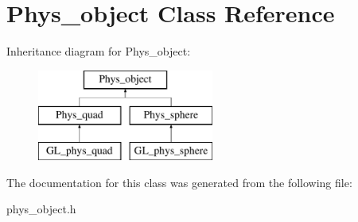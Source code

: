 \hypertarget{class_phys__object}{
\section{Phys\_\-object Class Reference}
\label{class_phys__object}
}
Inheritance diagram for Phys\_\-object:\begin{figure}[H]
\begin{center}
\leavevmode
\includegraphics[height=3.000000cm]{class_phys__object}
\end{center}
\end{figure}


The documentation for this class was generated from the following file:\begin{DoxyCompactItemize}
\item 
phys\_\-object.h\end{DoxyCompactItemize}
